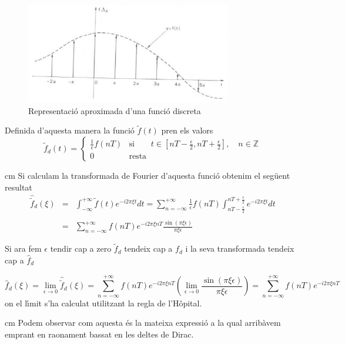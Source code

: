 \documentclass{article}
\def\Z{\mathbb Z}
\begin{document}
\begin{figure}[htbp]
\begin{center}
\includegraphics[width=9cm]{imatges/sampledf.eps}
\caption{Representaci\'o aproximada d'una funci\'o discreta}
\end{center}
\end{figure}

Definida d'aquesta manera la funci\'o $\tilde{f}(t)$ pren els valors
\[
\tilde{f}_d(t)=\begin{cases}
\frac{1}{\epsilon} f(nT) & \mathrm{si} 
\qquad t \in [nT-\frac{\epsilon}{2}, nT+\frac{\epsilon}{2}], 
\quad n \in \Z\\
0    & \mathrm{resta}
\end{cases}
\]

 cm
Si calculam la transformada de Fourier d'aquesta funci\'o obtenim
el seg\"uent resultat
\[
\begin{array}{lcl}
\hat{\tilde{f}}_d(\xi) & = & \int_{-\infty}^{+\infty} \tilde{f}(t) 
e^{- i 2 \pi \xi t} dt=\sum_{n=-\infty}^{+\infty} \frac{1}{\epsilon} f(nT) 
\int_{nT-\frac{\epsilon}{2}}^{nT+\frac{\epsilon}{2}} e^{- i 2 \pi \xi t} dt\\
\\
 & = &
\sum_{n=-\infty}^{+\infty} f(nT) e^{-i 2 \pi \xi n T}
\frac{\sin(\pi \xi \epsilon)}{\pi \xi \epsilon}
\end{array}
\]

Si ara fem $\epsilon$ tendir cap a zero $\tilde{f}_d$ tendeix cap a $f_d$
i la seva transformada tendeix cap a $\hat{f}_d$

\[
\hat{f}_d(\xi)=\lim_{\epsilon \rightarrow 0} \hat{\tilde{f}}_d(\xi)=
\sum_{n=-\infty}^{+\infty} f(nT) e^{-i 2 \pi \xi n T} 
(\lim_{\epsilon \rightarrow 0} \frac{\sin(\pi \xi \epsilon)}{\pi \xi \epsilon})
=\sum_{n=-\infty}^{+\infty} f(nT) e^{-i 2 \pi \xi n T}
\]
\noindent
on el l\'\i mit s'ha calculat utilitzant la regla de l'H\^opital.

 cm
Podem observar com aquesta \'es la mateixa expressi\'o a la qual
arrib\`avem emprant en raonament bassat en les deltes de Dirac.
\end{document}
